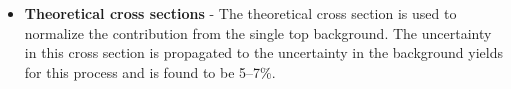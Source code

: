 \begin{itemize}
\item{\bf Theoretical cross sections} - The theoretical cross section is
  used to normalize the contribution from the single top
  background. The uncertainty in this cross section is propagated to
  the uncertainty in the background yields for this process and is
  found to be 5--7\%.

\end{itemize}
